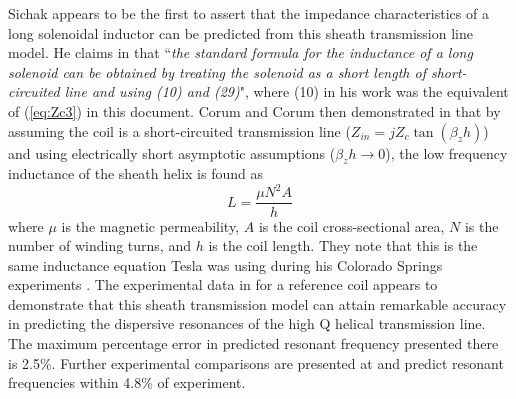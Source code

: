 Sichak appears to be the first to assert that the impedance characteristics of a long solenoidal inductor can be predicted from this sheath transmission line model. He claims in \cite{sichak1} that ``\textit{the standard formula for the inductance of a long solenoid can be obtained by treating the solenoid as a short length of short-circuited line and using (10) and (29)}", where (10) in his work was the equivalent of (\ref{eq:Zc3}) in this document. Corum and Corum then demonstrated in \cite{corum2} that by assuming the coil is a short-circuited transmission line ($Z_{in} = jZ_c\tan(\beta_z h)$) and using electrically short asymptotic assumptions ($\beta_z h \rightarrow 0$), the low frequency inductance of the sheath helix is found as
\begin{equation}\label{eq:inductance}
	L = \frac{\mu N^2A}{h}
\end{equation}
where $\mu$ is the magnetic permeability, $A$ is the coil cross-sectional area, $N$ is the number of winding turns, and $h$ is the coil length. They note that this is the same inductance equation Tesla was using during his Colorado Springs experiments \cite{colorado}. The experimental data in \cite{corum2} for a reference coil appears to demonstrate that this sheath transmission model can attain remarkable accuracy in predicting the dispersive resonances of the high Q helical transmission line. The maximum percentage error in predicted resonant frequency presented there is 2.5\%. Further experimental comparisons are presented at \cite{corum3} and predict resonant frequencies within 4.8\% of experiment. 
